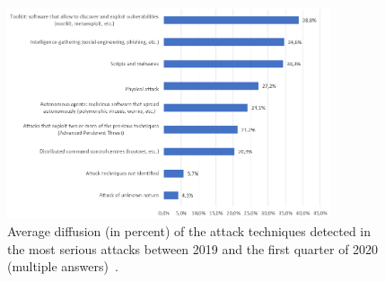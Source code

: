 \documentclass{easychair}
\begin{document}
\begin{figure}
  \centering
  \includegraphics[width=0.85\textwidth]{pictures/fig6.png}
  \caption{Average diffusion (in percent) of the attack techniques detected in the most serious attacks between 2019 and the first quarter of 2020 (multiple answers)~\cite{oad20}.}
  \label{fig:6}
\end{figure}
\end{document}
